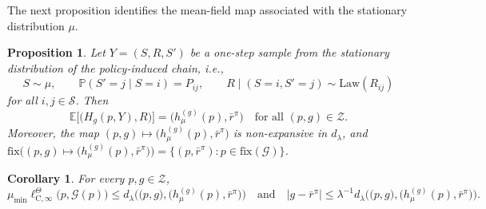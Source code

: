 \documentclass{article}
\newtheorem{proposition}[theorem]{Proposition}
\newtheorem{corollary}[theorem]{Corollary}
\newcommand{\X}{\mathcal{S}}
\newcommand{\E}{\mathbb{E}}
\begin{document}
The next proposition identifies the mean-field map associated with the stationary distribution $\mu$. 

\begin{proposition}\label{prop:mean-field-online}
Let $Y= (S, R, S')$ be a one-step sample from the stationary distribution of the policy-induced chain, i.e.,
\begin{equation}
S \sim \mu,\qquad \mathbb P(S'=j \mid S=i) = P_{ij},\qquad R \mid (S=i, S'=j) \sim \mathrm{Law}(R_{ij})
\end{equation}
for all $i, j \in \X$. Then
\begin{equation}
\E\bigl[\bigl(H_g(p, Y), R\bigr)\bigr] = \bigl(h^{(g)}_\mu(p), \bar r^\pi\bigr)\quad \text{for all } (p,g) \in \mathcal Z.
\end{equation}
Moreover, the map $(p, g) \mapsto\bigl(h^{(g)}_\mu(p), \bar r^\pi \bigr)$ is non-expansive in $d_\lambda$, and $\mathrm{fix}\bigl((p, g) \mapsto\bigl(h^{(g)}_\mu(p), \bar r^\pi \bigr)\bigr) = \{(p, \bar r^\pi): p \in \mathrm{fix}(\mathcal G)\}$.
\end{proposition}
\begin{corollary}\label{corol:residual-conv-online}
For every $p, g \in \mathcal Z$,
\begin{equation}
\mu_{\min}\ell^\Theta_{\mathrm C, \infty}\bigl(p, \mathcal G(p)\bigr) \le d_\lambda \bigl(\bigl(p, g\bigr), \bigl(h^{(g)}_\mu(p), \bar r^\pi\bigr) \bigr)\quad\text{and}\quad \lvert g- \bar r^\pi \rvert\le \lambda^{-1} d_\lambda \bigl(\bigl(p, g\bigr), \bigl(h^{(g)}_\mu(p), \bar r^\pi\bigr) \bigr).
\end{equation}
\end{corollary}
\end{document}
